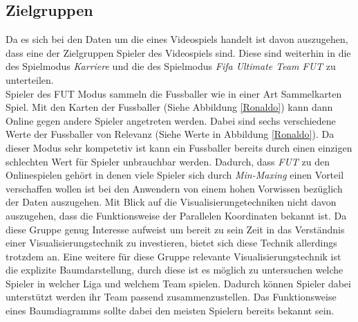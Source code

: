 \documentclass[usegeometry=true]{scrartcl}
\begin{document}

\subsection{Zielgruppen}
Da es sich bei den Daten um die eines Videospiels handelt ist davon auszugehen, dass eine der Zielgruppen Spieler des Videospiels sind. Diese sind weiterhin in die des Spielmodus \textit{Karriere} und die des Spielmodus \textit{Fifa Ultimate Team  FUT} zu unterteilen.\\
Spieler des FUT Modus sammeln die Fussballer wie in einer Art Sammelkarten Spiel. Mit den Karten der Fussballer (Siehe Abbildung \ref{Ronaldo}) kann dann Online gegen andere Spieler angetreten werden.
Dabei sind sechs verschiedene Werte der Fussballer von Relevanz (Siehe Werte in Abbildung \ref{Ronaldo}). Da dieser Modus sehr kompetetiv ist kann ein Fussballer bereits durch einen einzigen schlechten Wert für Spieler unbrauchbar werden.
Dadurch, dass \textit{FUT} zu den Onlinespielen gehört in denen viele Spieler sich durch \textit{Min-Maxing}\cite{noauthor_min-maxing_2014} einen Vorteil verschaffen wollen ist bei den Anwendern von einem hohen Vorwissen bezüglich der Daten auszugehen. Mit Blick auf die Visualisierungetechniken nicht davon auszugehen, dass die Funktionsweise der Parallelen Koordinaten bekannt ist. Da diese Gruppe genug Interesse aufweist um bereit zu sein Zeit in das Verständnis einer Visualisierungstechnik zu investieren, bietet sich diese Technik allerdings trotzdem an. Eine weitere für diese Gruppe relevante Visualisierungstechnik ist die explizite Baumdarstellung, durch diese ist es möglich zu untersuchen welche Spieler in welcher Liga und welchem Team spielen. Dadurch können Spieler dabei unterstützt werden ihr Team passend zusammenzustellen. Das Funktionsweise eines Baumdiagramms sollte dabei den meisten Spielern bereits bekannt sein.\\
\end{document}
